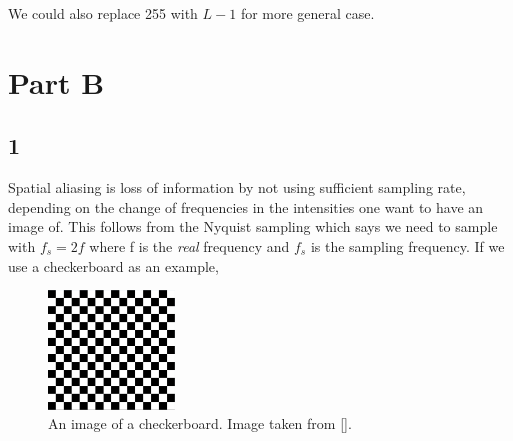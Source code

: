 {We could also replace 255 with $L-1$ for more general case.


\section{Part B}
\subsection{1}
Spatial aliasing is loss of information by not using sufficient sampling rate, depending on the change of frequencies in the intensities one want to have an image of. This follows from the Nyquist sampling which says we need to sample with $f_{s} = 2f$ where f is the \emph{real} frequency and $f_{s}$ is the sampling frequency. If we use a checkerboard as an example,

\begin{figure}[!htb]
{\centering
    \includegraphics[width=0.30\textwidth]{checker1.png}
    \caption{An image of a checkerboard. Image taken from [\cite{dip}].}
    \label{checker1}
\par}
\end{figure}



}
